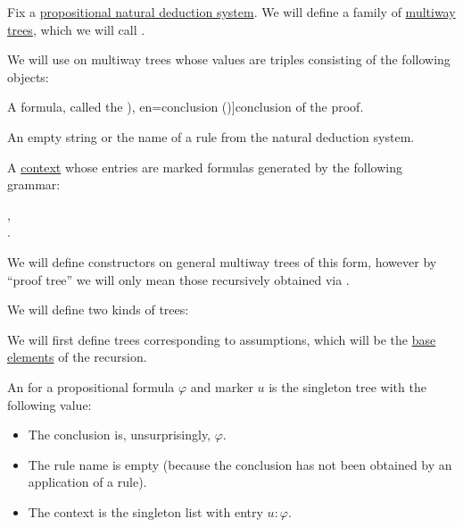 \begin{definition}\label{def:natural_deduction_proof_tree}\mimprovised
  Fix a \hyperref[def:propositional_natural_deduction_system]{propositional natural deduction system}. We will define a family of \hyperref[def:multiway_tree]{multiway trees}, which we will call .

  We will use  on multiway trees whose values are triples consisting of the following objects:
  \begin{thmenum}[series=def:natural_deduction_proof_tree]
     A formula, called the \term[ru=conclusion (\cite[35]{TroelstraSchwichtenberg2000}), en=conclusion (\cite[36]{TroelstraSchwichtenberg2000})]{conclusion} of the proof.

     An empty string or the name of a rule from the natural deduction system.

     A \hyperref[def:logical_context]{context} whose entries are marked formulas generated by the following grammar:
    \begin{bnf*}
                {}, \\
        { \bnfsp \bnftsq{:} \bnfsp {}}.
    \end{bnf*}
  \end{thmenum}

  We will define constructors on general multiway trees of this form, however by \enquote{proof tree} we will only mean those recursively obtained via .

  We will define two kinds of trees:
  \begin{thmenum}[resume=def:natural_deduction_proof_tree]
     We will first define trees corresponding to assumptions, which will be the \hyperref[thm:least_fixed_point_recursion/base]{base elements} of the recursion.

    An  for a propositional formula \( \varphi \) and marker \( u \) is the singleton tree with the following value:
    \begin{itemize}
      \item The conclusion is, unsurprisingly, \( \varphi \).
      \item The rule name is empty (because the conclusion has not been obtained by an application of a rule).
      \item The context is the singleton list with entry \( u: \varphi \).
    \end{itemize}


\end{thmenum}
\end{definition}
